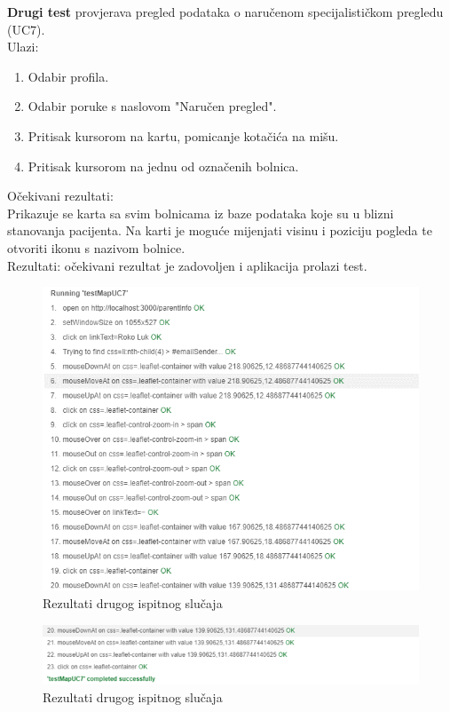 		\noindent \textbf{Drugi test} provjerava pregled podataka o naručenom specijalističkom pregledu (UC7). \\
			Ulazi: 
		\begin{enumerate}
			\item Odabir profila.
			\item Odabir poruke s naslovom "Naručen pregled".
			\item Pritisak kursorom na kartu, pomicanje kotačića na mišu.
			\item Pritisak kursorom na jednu od označenih bolnica.
		\end{enumerate}
		
		\noindent Očekivani rezultati:\\ Prikazuje se karta sa svim bolnicama iz baze podataka koje su u blizni stanovanja pacijenta. Na karti je moguće mijenjati visinu i poziciju pogleda te otvoriti ikonu s nazivom bolnice.\\
		Rezultati: očekivani rezultat je zadovoljen i aplikacija prolazi test.
		
		\begin{figure}[H]
			\includegraphics[width=\textwidth]{slike/pregledNaručivanja.PNG} %
			\caption{Rezultati drugog ispitnog slučaja}
			\label{fig:pregledKarteTest} %
		\end{figure}
		\begin{figure}[H]
			\includegraphics[width=\textwidth]{slike/pregledNaručivanja2.PNG} %
			\caption{Rezultati drugog ispitnog slučaja}
			\label{fig:pregledKarteTest2} %
		\end{figure}
		
